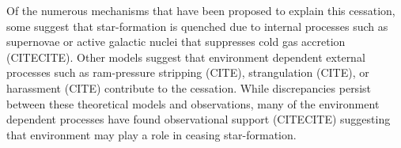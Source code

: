 \documentclass{emulateapj}
\begin{document}
Of the numerous mechanisms that have been proposed to explain this cessation, some suggest that star-formation is quenched due to internal processes such as supernovae or active galactic nuclei that suppresses cold gas accretion (CITECITE). Other models suggest that environment dependent external processes such as ram-pressure stripping (CITE), strangulation (CITE), or harassment (CITE) contribute to the cessation. While discrepancies persist between these theoretical models and observations, many of the environment dependent processes have found observational support (CITECITE) suggesting that environment may play a role in ceasing star-formation. 


\end{document}
